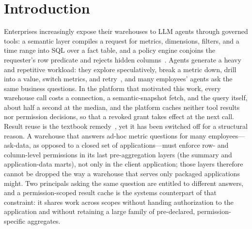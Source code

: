 \documentclass[sigconf, nonacm]{acmart}
\begin{document}
\maketitle

\vldbtopmatter

\section{Introduction}
\label{sec:intro}

Enterprises increasingly expose their warehouses to LLM agents through governed tools: a semantic layer compiles a request for metrics, dimensions, filters, and a time range into SQL over a fact table, and a policy engine conjoins the requester's row predicate and rejects hidden columns~\cite{mcpgw26,authzarch26}. Agents generate a heavy and repetitive workload: they explore speculatively, break a metric down, drill into a value, switch metrics, and retry~\cite{agentfirst25,wadlom26}, and many employees' agents ask the same business questions. In the platform that motivated this work, every warehouse call costs a connection, a semantic-snapshot fetch, and the query itself, about half a second at the median, and the platform caches neither tool results nor permission decisions, so that a revoked grant takes effect at the next call. Result reuse is the textbook remedy~\cite{hru96,goldstein01,ivanova09,dursun17}, yet it has been switched off for a structural reason. A warehouse that answers ad-hoc metric questions for many employees---ask-data, as opposed to a closed set of applications---must enforce row- and column-level permissions in its last pre-aggregation layers (the summary and application-data marts), not only in the client application; those layers therefore cannot be dropped the way a warehouse that serves only packaged applications might. Two principals asking the same question are entitled to different answers, and a permission-scoped result cache is the systems counterpart of that constraint: it shares work across scopes without handing authorization to the application and without retaining a large family of pre-declared, permission-specific aggregates.
\end{document}

